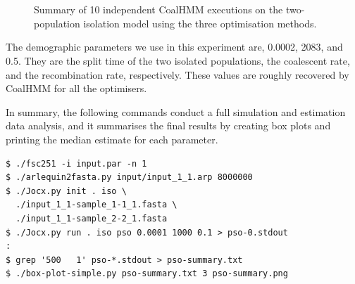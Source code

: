 \documentclass[graybox]{svmult}
\begin{document}
\begin{figure}[t]
\centering
{}\\
\\
\caption{Summary of 10 independent CoalHMM executions on the two-population isolation model using the three optimisation methods.}
\label{fig:est-summary}
\end{figure}

The demographic parameters we use in this experiment are, 0.0002, 2083, and 0.5.  They are the split time of the two isolated populations, the coalescent rate, and the recombination rate, respectively.  These values are roughly recovered by CoalHMM for all the optimisers.

In summary, the following commands conduct a full simulation and estimation data analysis, and it summarises the final results by creating box plots and printing the median estimate for each parameter.

{\scriptsize{}\begin{verbatim}
$ ./fsc251 -i input.par -n 1
$ ./arlequin2fasta.py input/input_1_1.arp 8000000
$ ./Jocx.py init . iso \
  ./input_1_1-sample_1-1_1.fasta \
  ./input_1_1-sample_2-2_1.fasta
$ ./Jocx.py run . iso pso 0.0001 1000 0.1 > pso-0.stdout
:
$ grep '500   1' pso-*.stdout > pso-summary.txt
$ ./box-plot-simple.py pso-summary.txt 3 pso-summary.png
\end{verbatim}}
\end{document}
